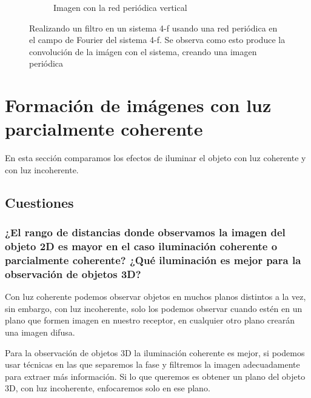 \documentclass{./packages/optica-article}
\begin{document}
\begin{figure}[hptb]
\begin{center}
\begin{subfigure}[t]{0.3\textwidth}
			\caption{Imagen con la red periódica vertical}
			\label{fig:filtrado:talbot:3}
		\end{subfigure}
		\caption{Realizando un filtro en un sistema 4-f usando una red periódica en el campo de Fourier del sistema 4-f. Se observa como esto produce la convolución de la imágen con el sistema, creando una imagen periódica}
		\label{fig:filtrado:all}
	\end{center}
\end{figure}


\section{Formación de imágenes con luz parcialmente coherente}

En esta sección comparamos los efectos de iluminar el objeto con luz coherente y con luz incoherente. 

\subsection{Cuestiones}
\subsubsection{¿El rango de distancias donde observamos la imagen del objeto 2D es mayor en el caso iluminación coherente o parcialmente coherente? ¿Qué iluminación es mejor para la observación de objetos 3D?}

Con luz coherente podemos observar objetos en muchos planos distintos a la vez, sin embargo, con luz incoherente, solo los podemos observar cuando estén en un plano que formen imagen en nuestro receptor, en cualquier otro plano crearán una imagen difusa.

Para la observación de objetos 3D la iluminación coherente es mejor, si podemos usar técnicas en las que separemos la fase y filtremos la imagen adecuadamente para extraer más información. Si lo que queremos es obtener un plano del objeto 3D, con luz incoherente, enfocaremos solo en ese plano.



%
\end{document}
